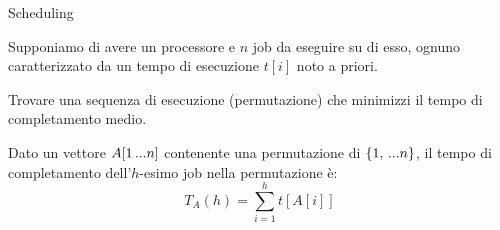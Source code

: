 \begin{frame}{Scheduling}

\vspace{-6pt}
\begin{myboxtitle}[Input]
	
Supponiamo di avere un processore e $n$ job da eseguire su di esso,
ognuno caratterizzato da un tempo di esecuzione $t[i]$ noto a priori.
\end{myboxtitle}

\begin{myboxtitle}[Problema]
Trovare una sequenza di esecuzione (permutazione) che minimizzi il \alert{tempo di completamento medio}.
\end{myboxtitle}

\begin{myboxtitle}

Dato un vettore $A[1 \mydots n]$ contenente una	permutazione di $\{ 1, \mydots n \}$,
il \alert{tempo di completamento} dell'$h$-esimo job nella permutazione è:
\[
  T_A(h) = \sum_{i=1}^h t[A[i]]
\] 
\end{myboxtitle}

\end{frame}	

